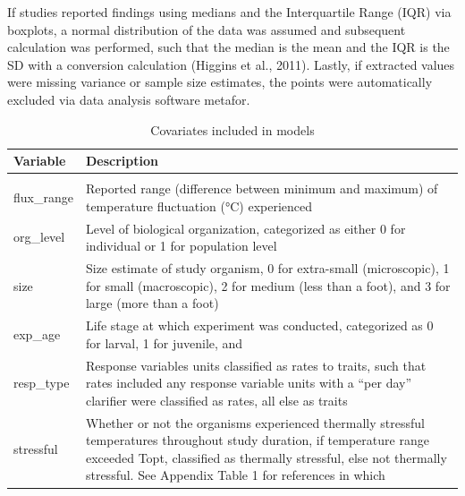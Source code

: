 \documentclass[12pt,twoside]{reedthesis}
\begin{document}
If studies reported findings using medians and the Interquartile Range (IQR) via boxplots, a normal distribution of the data was assumed and subsequent calculation was performed, such that the median is the mean and the IQR is the SD with a conversion calculation (Higgins et al., 2011). Lastly, if extracted values were missing variance or sample size estimates, the points were automatically excluded via data analysis software metafor.

\clearpage
\begin{table}[!h]

\caption{\label{tab:unnamed-chunk-9}Covariates included in models}
\centering
\begin{tabular}[t]{l>{\raggedright\arraybackslash}p{8cm}}
\toprule
\textbf{Variable} & \textbf{Description}\\
\midrule
\cellcolor{gray!6}{mean\_temp\_constant} & \cellcolor{gray!6}{Reported mean temperature (°C) in study}\\
flux\_range & Reported range (difference between minimum 
                                     and maximum) of temperature fluctuation (°C) experienced\\
org\_level & Level of biological organization, categorized
                                     as either 0 for individual or 1 for population level
\cellcolor{gray!6}{                                     responses}\\
size & Size estimate of study organism, 0 for extra-small
                                     (microscopic), 1 for small (macroscopic), 2 for medium 
                                     (less than a foot), and 3 for large (more than a foot)\\
exp\_age & Life stage at which experiment was conducted, 
                                     categorized as 0 for larval, 1 for juvenile, and 
\cellcolor{gray!6}{                                     2 for adult}\\
\addlinespace
resp\_type & Response variables units classified as rates to traits, 
                                     such that rates included any response variable units with a
                                     “per day” clarifier were classified as rates, all else as
                                     traits\\
stressful & Whether or not the organisms experienced thermally stressful 
                                     temperatures throughout study duration, if temperature range 
                                     exceeded Topt, classified as thermally stressful, else not
                                     thermally stressful. See Appendix Table 1 for references in which
\cellcolor{gray!6}{                                     organisms’ thermal stress metrics were included}\\
\bottomrule
\end{tabular}
\end{table}
\clearpage
\end{document}
